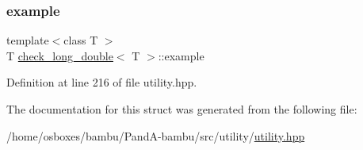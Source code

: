 \subsubsection{\texorpdfstring{example}{example}}
{\footnotesize\ttfamily template$<$class T $>$ \\
T \hyperlink{structcheck__long__double}{check\+\_\+long\+\_\+double}$<$ T $>$\+::example\hspace{0.3cm}{\ttfamily [private]}}



Definition at line 216 of file utility.\+hpp.



The documentation for this struct was generated from the following file\+:\begin{DoxyCompactItemize}
\item 
/home/osboxes/bambu/\+Pand\+A-\/bambu/src/utility/\hyperlink{utility_8hpp}{utility.\+hpp}\end{DoxyCompactItemize}
